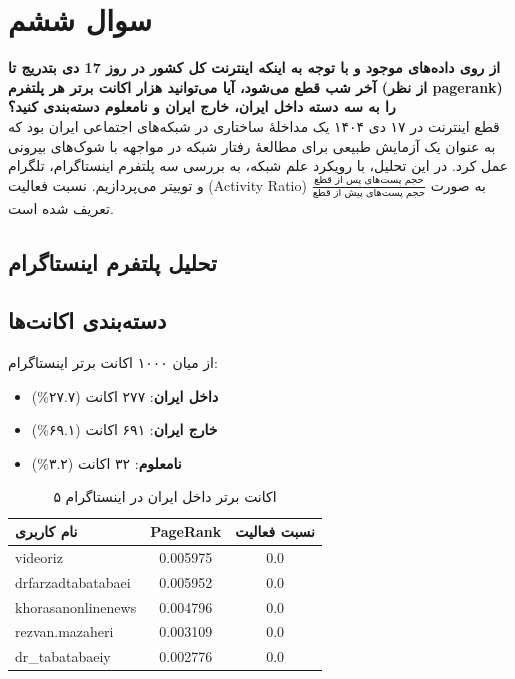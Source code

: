 \documentclass{article}
\begin{document}
\FloatBarrier
\section{سوال ششم}
\textbf{از روی داده‌های موجود و با توجه به اینکه اینترنت کل کشور در روز 17 دی بتدریج تا آخر شب قطع می‌شود، آیا می‌توانید هزار اکانت برتر هر پلتفرم (از نظر pagerank) را به سه دسته داخل ایران، خارج ایران و نامعلوم دسته‌بندی کنید؟}
\\
		قطع اینترنت در ۱۷ دی ۱۴۰۴ یک مداخلهٔ ساختاری در شبکه‌های اجتماعی ایران بود که به عنوان یک آزمایش طبیعی برای مطالعهٔ رفتار شبکه در مواجهه با شوک‌های بیرونی عمل کرد. در این تحلیل، با رویکرد علم شبکه، به بررسی سه پلتفرم اینستاگرام، تلگرام و توییتر می‌پردازیم. نسبت فعالیت (Activity Ratio) به صورت $\frac{\text{حجم پست‌های پس از قطع}}{\text{حجم پست‌های پیش از قطع}}$ تعریف شده است.
\subsection{تحلیل پلتفرم اینستاگرام}
		
\subsection*{دسته‌بندی اکانت‌ها}
		از میان ۱۰۰۰ اکانت برتر اینستاگرام:
		\begin{itemize}
			\item \textbf{داخل ایران}: ۲۷۷ اکانت (۲۷.۷\%)
			\item \textbf{خارج ایران}: ۶۹۱ اکانت (۶۹.۱\%)
			\item \textbf{نامعلوم}: ۳۲ اکانت (۳.۲\%)
		\end{itemize}
		
		\begin{table}[!htbp]
			\centering
			\caption{۵ اکانت برتر داخل ایران در اینستاگرام}
			\label{tab:insta_top_inside}
			\begin{tabular}{|l|c|c|}
				\hline
				\textbf{نام کاربری} & \textbf{PageRank} & \textbf{نسبت فعالیت} \\ \hline
				videoriz & 0.005975 & 0.0 \\ \hline
				drfarzadtabatabaei & 0.005952 & 0.0 \\ \hline
				khorasanonlinenews & 0.004796 & 0.0 \\ \hline
				rezvan.mazaheri & 0.003109 & 0.0 \\ \hline
				dr\_tabatabaeiy & 0.002776 & 0.0 \\ \hline
			\end{tabular}
		\end{table}
		
\end{document}
